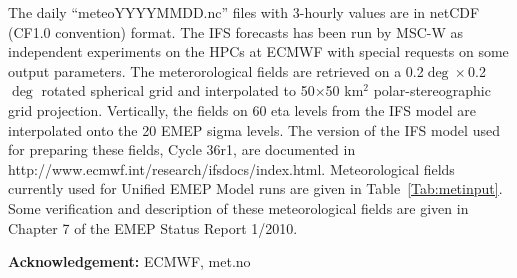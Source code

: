 The daily ``meteoYYYYMMDD.nc'' files with 3-hourly values are in netCDF
(CF1.0 convention) format. The IFS forecasts has been run by MSC-W as
independent experiments on the HPCs at ECMWF with special requests on
some output parameters. The meterorological fields are retrieved on a
0.2$\deg\times$0.2$\deg$ rotated spherical grid and interpolated to
50$\times$50 km$^2$ polar-stereographic grid projection. Vertically, the fields
on 60 eta levels from the IFS model are interpolated onto the 20 EMEP sigma
levels. The version of the IFS model used for preparing these fields,
Cycle 36r1, are documented in http://www.ecmwf.int/research/ifsdocs/index.html.
Meteorological fields currently used for Unified EMEP Model runs are given in
Table~\ref{Tab:metinput}. Some verification and description of these
meteorological fields are given in Chapter 7 of the EMEP Status Report
1/2010.

{\bf Acknowledgement:} ECMWF, met.no

